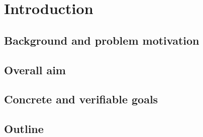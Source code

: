 \section{Introduction}\label{sec:intro}

\subsection{Background and problem motivation}\label{subsec:background}
\noindent

\subsection{Overall aim}\label{subsec:aim}
\noindent

\subsection{Concrete and verifiable goals}\label{subsec:goals}
\noindent

\subsection{Outline}\label{subsec:outline}
\noindent

